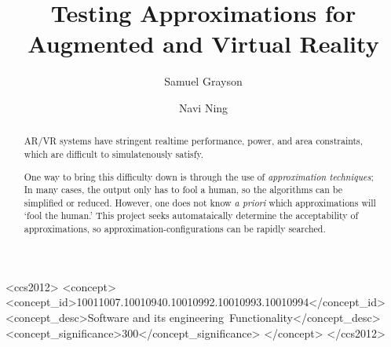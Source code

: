 \documentclass[sigconf,review,screen]{acmart}
\begin{document}
\title{Testing Approximations for Augmented and Virtual Reality}

\author{Samuel Grayson}

\author{Navi Ning}

\renewcommand\footnotetextcopyrightpermission[1]{} %

\newcommand{\todo}[1]{\textcolor{red}{#1}}

\begin{abstract}
AR/VR systems have stringent realtime performance, power, and area constraints, which are difficult to simulatenously satisfy.

One way to bring this difficulty down is through the use of \textit{approximation techniques}; In many cases, the output only has to fool a human, so the algorithms can be simplified or reduced. However, one does not know \textit{a priori} which approximations will `fool the human.' This project seeks automataically determine the acceptability of approximations, so approximation-configurations can be rapidly searched.
\end{abstract}

\begin{CCSXML}
<ccs2012>
<concept>
<concept_id>10011007.10010940.10010992.10010993.10010994</concept_id>
<concept_desc>Software and its engineering~Functionality</concept_desc>
<concept_significance>300</concept_significance>
</concept>
</ccs2012>
\end{CCSXML}



\maketitle







\end{document}
